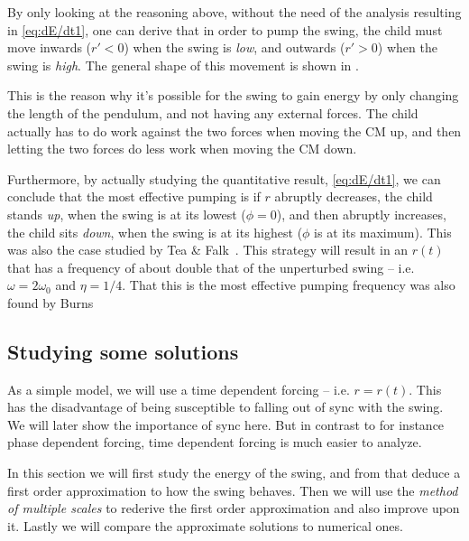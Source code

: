 \documentclass[11pt,letter, swedish, english,%
]{article}
\begin{document}
By only looking at the reasoning above, without the need of the
analysis resulting in \eqref{eq:dE/dt1}, one can derive that in
order to pump the swing, the child must move inwards ($r'<0$) when the
swing is \emph{low}, and outwards ($r'>0$) when the swing is 
\emph{high}. The general shape of this movement is shown in
. 


This is the reason why it's possible for the swing to gain energy by
only changing the length of the pendulum, and not having any external
forces. The child actually has to do work against the two forces when
moving the CM up, and then letting  the two forces do less work
when moving the CM down.

Furthermore, by actually studying the quantitative result,
\eqref{eq:dE/dt1}, we can conclude that the most effective pumping
is if $r$ abruptly decreases, the child stands \emph{up}, when
the swing is at its lowest ($\phi=0$), and then abruptly increases,
the child sits \emph{down}, when the swing is at its highest ($\phi$
is at its maximum). This was also the case studied by Tea \&
Falk~\cite{Tea_Falk_1968}. 
This strategy will result in an $r(t)$ that has a frequency of about
double that of the unperturbed swing -- i.e. $\omega=2\omega_0$ and
$\eta=1/4$. That this is the most effective pumping frequency was also
found by Burns \cite{Burns_1970}






\subsection{Studying some solutions}
As a simple model, we will use a time dependent forcing --
i.e. $r=r(t)$. This has the disadvantage of being susceptible to
falling out of sync with the swing. We will later show the importance
of sync here. But in contrast to for instance phase dependent forcing,
time dependent forcing is much easier to analyze. 

In this section we will first study the energy of the swing, and from
that deduce a first order approximation to how the swing behaves. Then
we will use the \emph{method of multiple scales} to rederive the first
order approximation and also improve upon it. Lastly we will compare
the approximate solutions to numerical ones. 
\end{document}
